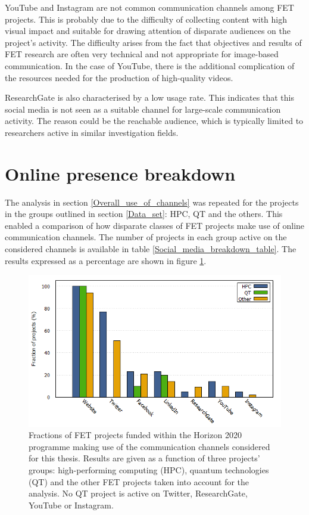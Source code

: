 YouTube and Instagram are not common communication channels among FET projects. This is probably due to the difficulty of collecting content with high visual impact and suitable for drawing attention of disparate audiences on the project's activity. The difficulty arises from the fact that objectives and results of FET research are often very technical and not appropriate for image-based communication. In the case of YouTube, there is the additional complication of the resources needed for the production of high-quality videos.

ResearchGate is also characterised by a low usage rate. This indicates that this social media is not seen as a suitable channel for large-scale communication activity. The reason could be the reachable audience, which is typically limited to researchers active in similar investigation fields.

\section{Online presence breakdown} \label{Online_presence_breakdown}
The analysis in section \ref{Overall_use_of_channels} was repeated for the projects in the groups outlined in section \ref{Data_set}: HPC, QT and the others. This enabled a comparison of how disparate classes of FET projects make use of online communication channels. The number of projects in each group active on the considered channels is available in table \ref{Social_media_breakdown_table}. The results expressed as a percentage are shown in figure \ref{Social_media_breakdown}. 

\begin{figure}[!t] 
 \begin{center}
 \includegraphics[scale=0.4]{Images/Social_media_breakdown.png}
 \caption{Fractions of FET projects funded within the Horizon 2020 programme making use of the communication channels considered for this thesis. Results are given as a function of three projects' groups: high-performing computing (HPC), quantum technologies (QT) and the other FET projects taken into account for the analysis. No QT project is active on Twitter, ResearchGate, YouTube or Instagram.}
 \label{Social_media_breakdown}
 \end{center}
\end{figure}

